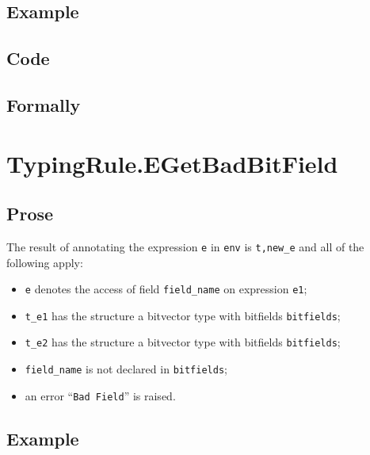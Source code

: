 \documentclass{book}
\begin{document}
  \subsection{Example}

  \subsection{Code}

\begin{emptyformal}
    \subsection{Formally}

\end{emptyformal}


\section{TypingRule.EGetBadBitField \label{sec:TypingRule.EGetBadBitField}}

  \subsection{Prose}
  The result of annotating the expression \texttt{e} in \texttt{env} is
\texttt{t,new\_e} and all of the following apply:
  \begin{itemize}
  \item \texttt{e} denotes the access of field \texttt{field\_name} on expression \texttt{e1};
  \item \texttt{t\_e1} has the structure a bitvector type with bitfields \texttt{bitfields};
  \item \texttt{t\_e2} has the structure a bitvector type with bitfields \texttt{bitfields};
  \item \texttt{field\_name} is not declared in \texttt{bitfields};
  \item an error ``\texttt{Bad Field}'' is raised.
  \end{itemize}

  \subsection{Example}
\end{document}

